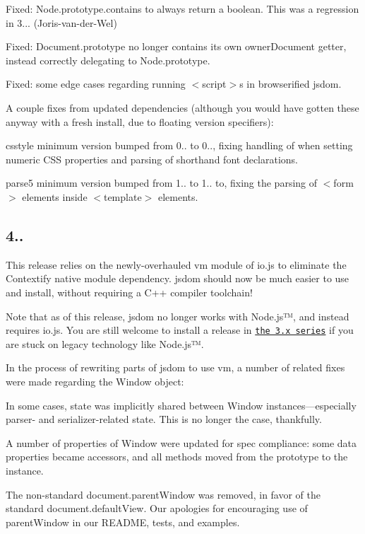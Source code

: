\begin{DoxyItemize}
\item Fixed\+: {\ttfamily Node.\+prototype.\+contains} to always return a boolean. This was a regression in 3... (Joris-\/van-\/der-\/\+Wel)
\item Fixed\+: {\ttfamily Document.\+prototype} no longer contains its own {\ttfamily owner\+Document} getter, instead correctly delegating to {\ttfamily Node.\+prototype}.
\item Fixed\+: some edge cases regarding running {\ttfamily $<$script$>$}s in browserified jsdom.
\item A couple fixes from updated dependencies (although you would have gotten these anyway with a fresh install, due to floating version specifiers)\+:
\begin{DoxyItemize}
\item csstyle minimum version bumped from 0.. to 0.., fixing handling of {} when setting numeric C\+SS properties and parsing of shorthand {\ttfamily font} declarations.
\item parse5 minimum version bumped from 1.. to 1.. to, fixing the parsing of {\ttfamily $<$form$>$} elements inside {\ttfamily $<$template$>$} elements.
\end{DoxyItemize}
\end{DoxyItemize}

\subsection*{4..}

This release relies on the newly-\/overhauled {\ttfamily vm} module of io.\+js to eliminate the Contextify native module dependency. jsdom should now be much easier to use and install, without requiring a C++ compiler toolchain!

Note that as of this release, jsdom no longer works with Node.\+js™, and instead requires io.\+js. You are still welcome to install a release in \href{https://github.com/tmpvar/jsdom/tree/3.x}{\tt the 3.\+x series} if you are stuck on legacy technology like Node.\+js™.

In the process of rewriting parts of jsdom to use {\ttfamily vm}, a number of related fixes were made regarding the {\ttfamily Window} object\+:


\begin{DoxyItemize}
\item In some cases, state was implicitly shared between {\ttfamily Window} instances—especially parser-\/ and serializer-\/related state. This is no longer the case, thankfully.
\item A number of properties of {\ttfamily Window} were updated for spec compliance\+: some data properties became accessors, and all methods moved from the prototype to the instance.
\item The non-\/standard {\ttfamily document.\+parent\+Window} was removed, in favor of the standard {\ttfamily document.\+default\+View}. Our apologies for encouraging use of {\ttfamily parent\+Window} in our R\+E\+A\+D\+ME, tests, and examples.
\end{DoxyItemize}

